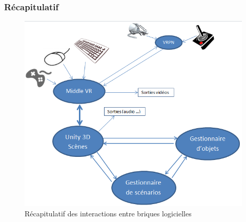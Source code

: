 \subsubsection{Récapitulatif}
\begin{figure}
	\centering
		\includegraphics[width=\textwidth]{2-Specifications/img/recap.png}
		\caption{Récapitulatif des interactions entre briques logicielles}
	\label{fig:unityvr}
\end{figure}


